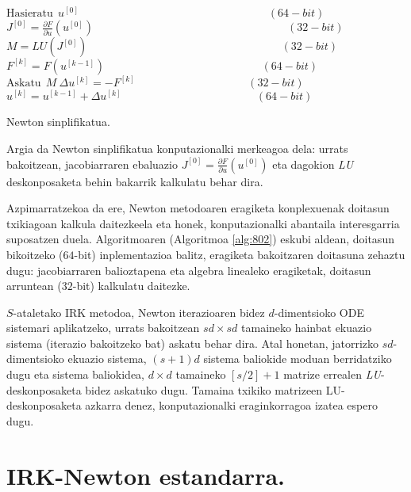 \begin{algorithm}[H]
  $ \text{Hasieratu} \ \ u^{[0]}   \quad \quad \quad \quad \quad \quad \quad \quad\quad \quad \quad \quad \quad \quad \quad \quad \quad    (64-bit)$\;
  $J^{[0]}=\frac{\partial F}{\partial u}(u^{[0]})  \ \ \quad \quad \quad \quad \quad \quad \quad \quad\quad \quad \quad \quad \quad \quad \quad \quad \quad    (32-bit)$\;
  $M=LU(J^{[0]}) \ \ \quad \quad \quad \quad \quad \quad \quad \quad\quad \quad \quad \quad \quad \quad \quad \quad \quad    (32-bit)$\;
  {
   \BlankLine
   $F^{[k]}=F(u^{[k-1]}) \ \ \quad \ \quad \quad \quad \quad \quad \quad \quad \quad \quad \quad \quad \quad \ \   (64-bit)$\;
   $\text{Askatu} \ \ M \ \Delta u^{[k]}=- F^{[k]} \ \quad \ \quad \quad \quad \quad \quad \quad \quad \quad \ \ \  (32-bit)$\;
   \BlankLine
   $u^{[k]}=u^{[k-1]}+\Delta u^{[k]}  \ \ \ \quad \quad \quad \quad\quad \quad \quad \quad \quad \quad \quad \ \     (64-bit)$\;
  }
 \caption{Newton sinplifikatua.}
 \label{alg:802}
\end{algorithm}

Argia da Newton sinplifikatua konputazionalki merkeagoa dela: urrats bakoitzean, jacobiarraren ebaluazio $J^{[0]}=\frac{\partial F}{\partial u}(u^{[0]})$ eta dagokion \emph{LU} deskonposaketa behin bakarrik kalkulatu behar dira. 

Azpimarratzekoa da ere, Newton metodoaren eragiketa konplexuenak doitasun txikiagoan kalkula daitezkeela \cite{Baboulin20092526} eta honek, konputazionalki abantaila interesgarria suposatzen duela. Algoritmoaren (Algoritmoa \ref{alg:802}) eskubi aldean, doitasun bikoitzeko ($64$-bit) inplementazioa balitz, eragiketa bakoitzaren doitasuna zehaztu dugu: jacobiarraren balioztapena eta algebra linealeko eragiketak, doitasun arruntean ($32$-bit) kalkulatu daitezke.

$S$-ataletako IRK metodoa, Newton iterazioaren bidez $d$-dimentsioko ODE sistemari aplikatzeko, urrats bakoitzean $sd \times sd$ tamaineko hainbat ekuazio sistema (iterazio bakoitzeko bat) askatu behar dira. Atal honetan, jatorrizko $sd$-dimentsioko ekuazio sistema, $(s+1)d$ sistema baliokide moduan berridatziko dugu eta sistema baliokidea,  $d \times d$ tamaineko $[s/2]+1$ matrize errealen \emph{LU}-deskonposaketa bidez askatuko dugu. Tamaina txikiko matrizeen LU-deskonposaketa azkarra denez, konputazionalki eraginkorragoa izatea espero dugu.   

\section{IRK-Newton estandarra.}

